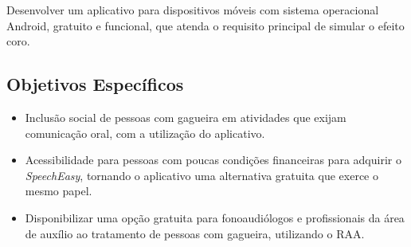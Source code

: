 Desenvolver um aplicativo para dispositivos m\'oveis com sistema operacional Android, gratuito e funcional, que atenda o requisito principal de simular o efeito coro. 

\subsection{Objetivos Espec\'ificos}

\begin{itemize}
	\item Inclus\~ao social de pessoas com gagueira em atividades que exijam comunica\c{c}\~ao oral, com a utiliza\c{c}\~ao do aplicativo.
	\item Acessibilidade para pessoas com poucas condi\c{c}\~oes financeiras para adquirir o \textit{SpeechEasy}, tornando o aplicativo uma alternativa gratuita que exerce o mesmo papel.
	\item Disponibilizar uma op\c{c}\~ao gratuita para fonoaudi\'ologos e profissionais da \'area de aux\'ilio ao tratamento de pessoas com gagueira, utilizando o RAA.
\end{itemize} 